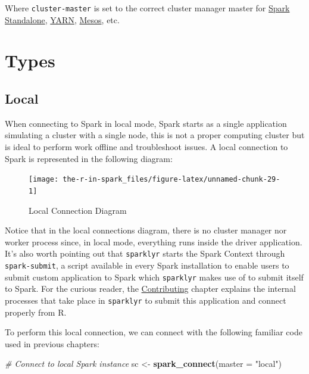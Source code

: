 \documentclass[]{book}
\newenvironment{Shaded}{\begin{snugshade}}{\end{snugshade}}
\newcommand{\CommentTok}[1]{\textcolor[rgb]{0.56,0.35,0.01}{\textit{#1}}}
\newcommand{\DataTypeTok}[1]{\textcolor[rgb]{0.13,0.29,0.53}{#1}}
\newcommand{\KeywordTok}[1]{\textcolor[rgb]{0.13,0.29,0.53}{\textbf{#1}}}
\newcommand{\NormalTok}[1]{#1}
\newcommand{\StringTok}[1]{\textcolor[rgb]{0.31,0.60,0.02}{#1}}
\theoremstyle{definition}
\theoremstyle{definition}
\theoremstyle{definition}
\theoremstyle{remark}
\begin{document}
Where \texttt{cluster-master} is set to the correct cluster manager
master for \href{Standalone}{Spark Standalone}, \href{Yarn}{YARN},
\protect\hyperlink{mesos-1}{Mesos}, etc.

\hypertarget{types}{%
\section{Types}\label{types}}

\hypertarget{local}{%
\subsection{Local}\label{local}}

When connecting to Spark in local mode, Spark starts as a single
application simulating a cluster with a single node, this is not a
proper computing cluster but is ideal to perform work offline and
troubleshoot issues. A local connection to Spark is represented in the
following diagram:

\begin{figure}

{\centering \texttt{[image: the-r-in-spark\_files/figure-latex/unnamed-chunk-29-1]} 

}

\caption{Local Connection Diagram}\label{fig:unnamed-chunk-29}
\end{figure}

Notice that in the local connections diagram, there is no cluster
manager nor worker process since, in local mode, everything runs inside
the driver application. It's also worth pointing out that
\texttt{sparklyr} starts the Spark Context through
\texttt{spark-submit}, a script available in every Spark installation to
enable users to submit custom application to Spark which
\texttt{sparklyr} makes use of to submit itself to Spark. For the
curious reader, the \protect\hyperlink{contributing}{Contributing}
chapter explains the internal processes that take place in
\texttt{sparklyr} to submit this application and connect properly from
R.

To perform this local connection, we can connect with the following
familiar code used in previous chapters:

\begin{Shaded}
\begin{Highlighting}[]
\CommentTok{# Connect to local Spark instance}
\NormalTok{sc <-}\StringTok{ }\KeywordTok{spark_connect}\NormalTok{(}\DataTypeTok{master =} \StringTok{"local"}\NormalTok{)}
\end{Highlighting}
\end{Shaded}
\end{document}
